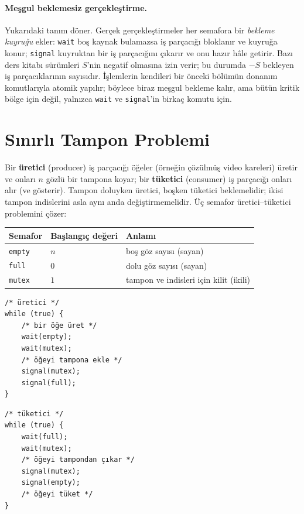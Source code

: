 \documentclass[11pt,a4paper]{article}
\newcommand{\term}[1]{\textbf{\color{mintdeep}#1}}
\begin{document}
\paragraph{Meşgul beklemesiz gerçekleştirme.} Yukarıdaki tanım döner. Gerçek gerçekleştirmeler her semafora bir \emph{bekleme kuyruğu} ekler: \texttt{wait} boş kaynak bulamazsa iş parçacığı bloklanır ve kuyruğa konur; \texttt{signal} kuyruktan bir iş parçacığını çıkarır ve onu hazır hâle getirir. Bazı ders kitabı sürümleri $S$'nin negatif olmasına izin verir; bu durumda $-S$ bekleyen iş parçacıklarının sayısıdır. İşlemlerin kendileri bir önceki bölümün donanım komutlarıyla atomik yapılır; böylece biraz meşgul bekleme kalır, ama bütün kritik bölge için değil, yalnızca \texttt{wait} ve \texttt{signal}'in birkaç komutu için.

\section{Sınırlı Tampon Problemi}

Bir \term{üretici} (producer) iş parçacığı öğeler (örneğin çözülmüş video kareleri) üretir ve onları $n$ gözlü bir tampona koyar; bir \term{tüketici} (consumer) iş parçacığı onları alır (ve gösterir). Tampon doluyken üretici, boşken tüketici beklemelidir; ikisi tampon indislerini asla aynı anda değiştirmemelidir. Üç semafor üretici--tüketici problemini çözer:

\begin{center}
\renewcommand{\arraystretch}{1.2}
\begin{tabular}{@{}lll@{}}
\toprule
\textbf{Semafor} & \textbf{Başlangıç değeri} & \textbf{Anlamı}\\
\midrule
\texttt{empty} & $n$ & boş göz sayısı (sayan)\\
\texttt{full} & $0$ & dolu göz sayısı (sayan)\\
\texttt{mutex} & $1$ & tampon ve indisleri için kilit (ikili)\\
\bottomrule
\end{tabular}
\end{center}

\begin{center}
\begin{minipage}[t]{0.46\linewidth}
\begin{lstlisting}[numbers=none]
/* üretici */
while (true) {
    /* bir öğe üret */
    wait(empty);
    wait(mutex);
    /* öğeyi tampona ekle */
    signal(mutex);
    signal(full);
}
\end{lstlisting}
\end{minipage}\hfill
\begin{minipage}[t]{0.46\linewidth}
\begin{lstlisting}[numbers=none]
/* tüketici */
while (true) {
    wait(full);
    wait(mutex);
    /* öğeyi tampondan çıkar */
    signal(mutex);
    signal(empty);
    /* öğeyi tüket */
}
\end{lstlisting}
\end{minipage}
\end{center}
\end{document}
